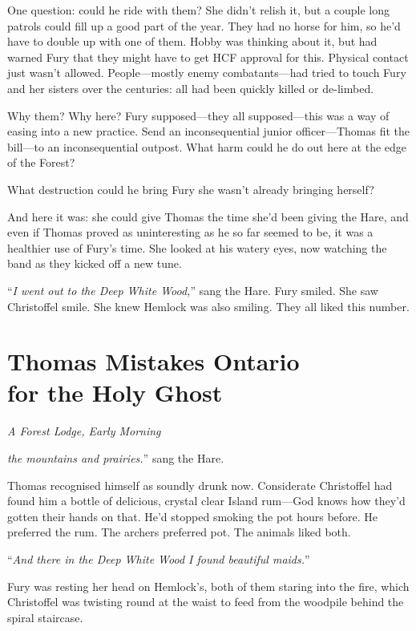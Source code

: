 \documentclass[11pt,a5paper]{article}
\newcommand{\alet}[1]{\textit{#1}\vspace{1em}}
\begin{document}
One question: could he ride with them? She didn't relish it, but a couple long patrols could fill up a good part of the year. They had no horse for him, so he'd have to double up with one of them. Hobby was thinking about it, but had warned Fury that they might have to get HCF approval for this. Physical contact just wasn't allowed. People---mostly enemy combatants---had tried to touch Fury and her sisters over the centuries: all had been quickly killed or de-limbed.

Why them? Why here? Fury supposed---they all supposed---this was a way of easing into a new practice. Send an inconsequential junior officer---Thomas fit the bill---to an inconsequential outpost. What harm could he do out here at the edge of the Forest?

What destruction could he bring Fury she wasn't already bringing herself?

And here it was: she could give Thomas the time she'd been giving the Hare, and even if Thomas proved as uninteresting as he so far seemed to be, it was a healthier use of Fury's time. She looked at his watery eyes, now watching the band as they kicked off a new tune.

``\emph{I went out to the Deep White Wood,}'' sang the Hare. Fury smiled. She saw Christoffel smile. She knew Hemlock was also smiling. They all liked this number.

\newpage

\section{Thomas Mistakes Ontario\\ for the Holy Ghost}

\alet{A Forest Lodge, Early Morning}

 \emph{the mountains and prairies.}'' sang the Hare.

Thomas recognised himself as soundly drunk now. Considerate Christoffel had found him a bottle of delicious, crystal clear Island rum---God knows how they'd gotten their hands on that. He'd stopped smoking the pot hours before. He preferred the rum. The archers preferred pot. The animals liked both.

``\emph{And there in the Deep White Wood I found beautiful maids.}''

Fury was resting her head on Hemlock's, both of them staring into the fire, which Christoffel was twisting round at the waist to feed from the woodpile behind the spiral staircase.
\end{document}
